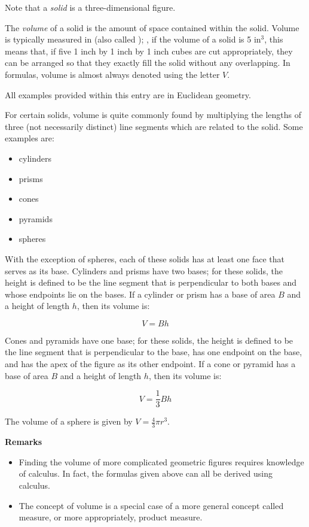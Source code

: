 \documentclass[12pt]{article}
\begin{document}

Note that a \emph{solid} is a three-dimensional figure.

The \emph{volume} of a solid is the amount of space contained within the solid.  Volume is typically measured in  (also called ); , if the volume of a solid is 5 $\text{in}^3$, this means that, if five 1 inch by 1 inch by 1 inch cubes are cut appropriately, they can be arranged so that they exactly fill the solid without any overlapping. In formulas, volume is almost always denoted using the letter $V$.

All examples provided within this entry are in Euclidean geometry.

For certain solids, volume is quite commonly found by multiplying the lengths of three (not necessarily distinct) line segments which are related to the solid.  Some examples are:

\begin{itemize}
\item cylinders
\item prisms
\item cones
\item pyramids
\item spheres
\end{itemize}

With the exception of spheres, each of these solids has at least one face that serves as its base.  Cylinders and prisms have two bases; for these solids, the height is defined to be the line segment that is perpendicular to both bases and whose endpoints lie on the bases.  If a cylinder or prism has a base of area $B$ and a height of length $h$, then its volume is:

$$V=Bh$$

Cones and pyramids have one base; for these solids, the height is defined to be the line segment that is perpendicular to the base, has one endpoint on the base, and has the apex of the figure as its other endpoint.  If a cone or pyramid has a base of area $B$ and a height of length $h$, then its volume is:

$$V=\frac{1}{3}Bh$$

The volume of a sphere is given by $\displaystyle V=\frac{4}{3} \pi r^3$.

\textbf{Remarks}
\begin{itemize}
\item Finding the volume of more complicated geometric figures requires knowledge of calculus.  In fact, the formulas given above can all be derived using calculus.
\item The concept of volume is a special case of a more general concept called measure, or more appropriately, product measure.
\end{itemize}
\end{document}
